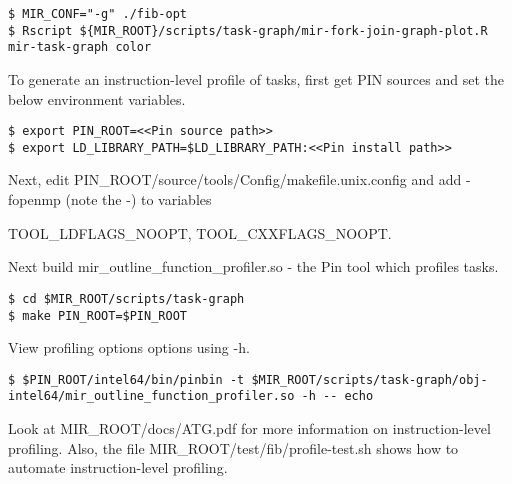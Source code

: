 \documentclass[11pt,a4paper,notitlepage]{article}
\begin{document}
\begin{lstlisting}[style=BashInputStyle]
$ MIR_CONF="-g" ./fib-opt
$ Rscript ${MIR_ROOT}/scripts/task-graph/mir-fork-join-graph-plot.R mir-task-graph color
\end{lstlisting}

To generate an instruction-level profile of tasks, first get PIN sources and set the below environment variables.
\begin{lstlisting}[style=BashInputStyle]
$ export PIN_ROOT=<<Pin source path>>
$ export LD_LIBRARY_PATH=$LD_LIBRARY_PATH:<<Pin install path>>
\end{lstlisting}

Next, edit PIN\_ROOT/source/tools/Config/makefile.unix.config and add -fopenmp (note the -) to variables 
\begin{tiny}{TOOL\_LDFLAGS\_NOOPT, TOOL\_CXXFLAGS\_NOOPT}.\end{tiny}

Next build mir\_outline\_function\_profiler.so - the Pin tool which profiles tasks.
\begin{lstlisting}[style=BashInputStyle]
$ cd $MIR_ROOT/scripts/task-graph
$ make PIN_ROOT=$PIN_ROOT
\end{lstlisting}

View profiling options options using -h.
\begin{lstlisting}[style=BashInputStyle]
$ $PIN_ROOT/intel64/bin/pinbin -t $MIR_ROOT/scripts/task-graph/obj-intel64/mir_outline_function_profiler.so -h -- echo
\end{lstlisting}

Look at MIR\_ROOT/docs/ATG.pdf for more information on instruction-level profiling.
Also, the file MIR\_ROOT/test/fib/profile-test.sh shows how to automate instruction-level profiling.
\end{document}
